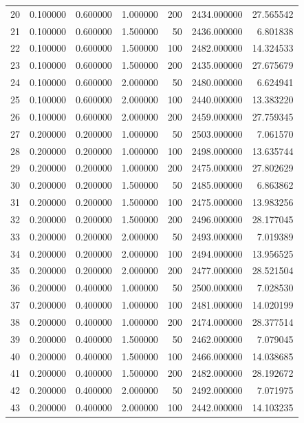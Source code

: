 \begin{longtable}{lrrrrrr}
20 & 0.100000 & 0.600000 & 1.000000 & 200 & 2434.000000 & 27.565542 \\
21 & 0.100000 & 0.600000 & 1.500000 & 50 & 2436.000000 & 6.801838 \\
22 & 0.100000 & 0.600000 & 1.500000 & 100 & 2482.000000 & 14.324533 \\
23 & 0.100000 & 0.600000 & 1.500000 & 200 & 2435.000000 & 27.675679 \\
24 & 0.100000 & 0.600000 & 2.000000 & 50 & 2480.000000 & 6.624941 \\
25 & 0.100000 & 0.600000 & 2.000000 & 100 & 2440.000000 & 13.383220 \\
26 & 0.100000 & 0.600000 & 2.000000 & 200 & 2459.000000 & 27.759345 \\
27 & 0.200000 & 0.200000 & 1.000000 & 50 & 2503.000000 & 7.061570 \\
28 & 0.200000 & 0.200000 & 1.000000 & 100 & 2498.000000 & 13.635744 \\
29 & 0.200000 & 0.200000 & 1.000000 & 200 & 2475.000000 & 27.802629 \\
30 & 0.200000 & 0.200000 & 1.500000 & 50 & 2485.000000 & 6.863862 \\
31 & 0.200000 & 0.200000 & 1.500000 & 100 & 2475.000000 & 13.983256 \\
32 & 0.200000 & 0.200000 & 1.500000 & 200 & 2496.000000 & 28.177045 \\
33 & 0.200000 & 0.200000 & 2.000000 & 50 & 2493.000000 & 7.019389 \\
34 & 0.200000 & 0.200000 & 2.000000 & 100 & 2494.000000 & 13.956525 \\
35 & 0.200000 & 0.200000 & 2.000000 & 200 & 2477.000000 & 28.521504 \\
36 & 0.200000 & 0.400000 & 1.000000 & 50 & 2500.000000 & 7.028530 \\
37 & 0.200000 & 0.400000 & 1.000000 & 100 & 2481.000000 & 14.020199 \\
38 & 0.200000 & 0.400000 & 1.000000 & 200 & 2474.000000 & 28.377514 \\
39 & 0.200000 & 0.400000 & 1.500000 & 50 & 2462.000000 & 7.079045 \\
40 & 0.200000 & 0.400000 & 1.500000 & 100 & 2466.000000 & 14.038685 \\
41 & 0.200000 & 0.400000 & 1.500000 & 200 & 2482.000000 & 28.192672 \\
42 & 0.200000 & 0.400000 & 2.000000 & 50 & 2492.000000 & 7.071975 \\
43 & 0.200000 & 0.400000 & 2.000000 & 100 & 2442.000000 & 14.103235 \\

\end{longtable}
